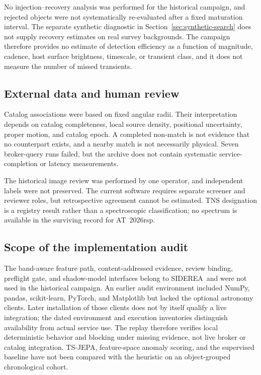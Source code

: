 \documentclass[11pt]{article}
\newcommand{\siderea}{SIDEREA}
\begin{document}
No injection--recovery analysis was performed for the historical campaign, and rejected objects were not systematically re-evaluated after a fixed maturation interval. The separate synthetic diagnostic in Section~\ref{sec:synthetic-search} does not supply recovery estimates on real survey backgrounds. The campaign therefore provides no estimate of detection efficiency as a function of magnitude, cadence, host surface brightness, timescale, or transient class, and it does not measure the number of missed transients.

\subsection{External data and human review}

Catalog associations were based on fixed angular radii. Their interpretation depends on catalog completeness, local source density, positional uncertainty, proper motion, and catalog epoch. A completed non-match is not evidence that no counterpart exists, and a nearby match is not necessarily physical. Seven broker-query runs failed, but the archive does not contain systematic service-completion or latency measurements.

The historical image review was performed by one operator, and independent labels were not preserved. The current software requires separate screener and reviewer roles, but retrospective agreement cannot be estimated. TNS designation is a registry result rather than a spectroscopic classification; no spectrum is available in the surviving record for AT~2026rsp.

\subsection{Scope of the implementation audit}

The band-aware feature path, content-addressed evidence, review binding, preflight gate, and shadow-model interfaces belong to \siderea\ and were not used in the historical campaign. An earlier audit environment included NumPy, pandas, scikit-learn, PyTorch, and Matplotlib but lacked the optional astronomy clients. Later installation of those clients does not by itself qualify a live integration; the dated environment and execution inventories distinguish availability from actual service use. The replay therefore verifies local deterministic behavior and blocking under missing evidence, not live broker or catalog integration. TS-JEPA, feature-space anomaly scoring, and the supervised baseline have not been compared with the heuristic on an object-grouped chronological cohort.
\end{document}
